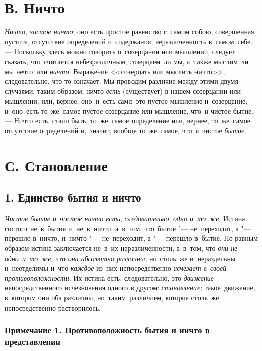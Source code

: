 \section[В. Ничто]{В. Ничто}
{\em Ничто}, {\em чистое ничто}; оно
есть простое равенство с~самим собою, совершенная пустота, отсутствие
определений и~содержания; неразличенность в~самом~себе. --- Поскольку
здесь можно говорить о~созерцании или мышлении, следует сказать,
что~считается небезразличным, созерцаем~ли мы, а~также мыслим~ли мы
нечто~или {\em ничто}. Выражение <<созерцать или мыслить ничто>>,
следовательно, что-то означает. Мы проводим различие между этими двумя
случаями; таким образом, ничто {\em есть} (существует)
в нашем созерцании или мышлении; или, вернее, оно~и~есть само~это пустое
мышление и~созерцание; и~оно~есть то~же~самое пустое созерцание или
мышление, что~и чистое бытие. --- Ничто есть, стало быть, то~же~самое
определение или, вернее, то~же~самое отсутствие определений и,~значит,
вообще то~же~самое, что~и чистое {\em бытие}.

\section[С. Становление]{С. Становление}
\subsection[1. Единство бытия и ничто]{1. Единство бытия и ничто}
{\em Чистое бытие и~чистое ничто есть},
{\em следовательно}, {\em одно и~то~же}.
Истина состоит не~в~бытии и~не~в~ничто, а~в~том, что~бытие "---
не~переходит, а "--- перешло в~ничто, и~ничто "---~не~переходит,
а "---~перешло в~бытие. Но равным образом истина заключается
не~в~их неразличенности, а~в~том, что {\em они не одно~и~то~же}, что
{\em они абсолютно различны}, но~столь~же и~нераздельны
и~неотделимы и~что {\em каждое} из~них непосредственно
{\em исчезает в~своей противоположности}. Их истина
есть, следовательно, это {\em движение}
непосредственного исчезновения одного в другом:
{\em становление}; такое~движение, в~котором они оба
различны, но~таким~различием, которое столь~же непосредственно
растворилось.

\subsubsection[Примечание 1. Противоположность бытия и ничто в представлении]
{Примечание 1. Противоположность бытия и ничто в представлении}

